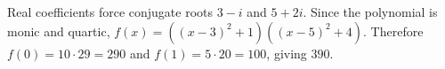 Real coefficients force conjugate roots $3-i$ and $5+2i$. Since the polynomial is monic and quartic, $f(x)=((x-3)^2+1)((x-5)^2+4)$. Therefore $f(0)=10\cdot29=290$ and $f(1)=5\cdot20=100$, giving $\boxed{390}$.
